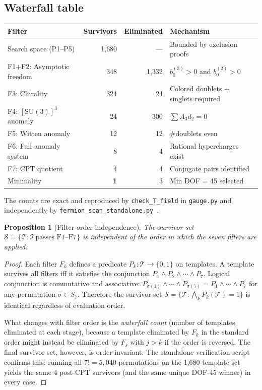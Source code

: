 \documentclass[11pt,a4paper]{article}
\newtheorem{proposition}[theorem]{Proposition}
\theoremstyle{definition}
\newcommand{\SU}{\mathrm{SU}}
\begin{document}
\subsection{Waterfall table}
\label{sec:waterfall}

\begin{center}
\small
\begin{tabular}{@{}lrrl@{}}
\toprule
\textbf{Filter} & \textbf{Survivors} & \textbf{Eliminated} & \textbf{Mechanism} \\
\midrule
Search space (P1--P5) & 1{,}680 & --- & Bounded by exclusion proofs \\
F1+F2: Asymptotic freedom & 348 & 1{,}332 & $b_0^{(3)} > 0$ and $b_0^{(2)} > 0$ \\
F3: Chirality & 324 & 24 & Colored doublets + singlets required \\
F4: $[\SU(3)]^3$ anomaly & 24 & 300 & $\sum A_3 d_2 = 0$ \\
F5: Witten anomaly & 12 & 12 & $\#$doublets even \\
F6: Full anomaly system & 8 & 4 & Rational hypercharges exist \\
F7: CPT quotient & 4 & 4 & Conjugate pairs identified \\
Minimality & \textbf{1} & 3 & Min DOF = 45 selected \\
\bottomrule
\end{tabular}
\end{center}

\smallskip\noindent The counts are exact and reproduced by
\texttt{check\_T\_field} in \texttt{gauge.py} and independently by
\texttt{fermion\_scan\_standalone.py}~\cite{BrookeFermionScan}.

\begin{proposition}[Filter-order independence]\label{prop:filter_order}
The survivor set $\mathcal{S} = \{\mathcal{T} : \mathcal{T} \text{
passes F1--F7}\}$ is independent of the order in which the seven
filters are applied.
\end{proposition}

\begin{proof}
Each filter $F_k$ defines a predicate $P_k: \mathcal{T} \to
\{0, 1\}$ on templates.  A template survives all filters iff it
satisfies the conjunction $P_1 \wedge P_2 \wedge \cdots \wedge P_7$.
Logical conjunction is commutative and associative:
$P_{\sigma(1)} \wedge \cdots \wedge P_{\sigma(7)} = P_1 \wedge
\cdots \wedge P_7$ for any permutation $\sigma \in S_7$.  Therefore
the survivor set $\mathcal{S} = \{\mathcal{T} : \bigwedge_k
P_k(\mathcal{T}) = 1\}$ is identical regardless of evaluation order.

What changes with filter order is the \emph{waterfall count} (number
of templates eliminated at each stage), because a template eliminated
by $F_k$ in the standard order might instead be eliminated by
$F_j$ with $j > k$ if the order is reversed.  The final survivor
set, however, is order-invariant.  The standalone verification
script confirms this: running all $7! = 5{,}040$ permutations on
the 1{,}680-template set yields the same 4 post-CPT survivors (and
the same unique DOF-45 winner) in every case.
\end{proof}
\end{document}
